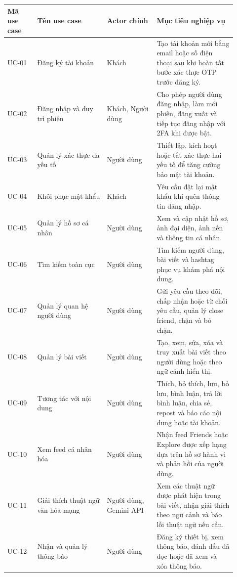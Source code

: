 {\def\LTcaptype{none}
\begin{longtable}{
  |>{\centering\arraybackslash}p{0.12\linewidth}
  |>{\raggedright\arraybackslash}p{0.28\linewidth}
  |>{\raggedright\arraybackslash}p{0.20\linewidth}
  |>{\raggedright\arraybackslash}p{0.32\linewidth}|}
\hline
\textbf{Mã use case} & \textbf{Tên use case} & \textbf{Actor chính} & \textbf{Mục tiêu nghiệp vụ} \\ \hline
\endhead
\hline
\endlastfoot
UC-01 & Đăng ký tài khoản & Khách & Tạo tài khoản mới bằng email hoặc số điện thoại sau khi hoàn tất bước xác thực OTP trước đăng ký. \\ \hline
UC-02 & Đăng nhập và duy trì phiên & Khách, Người dùng & Cho phép người dùng đăng nhập, làm mới phiên, đăng xuất và tiếp tục đăng nhập với 2FA khi được bật. \\ \hline
UC-03 & Quản lý xác thực đa yếu tố & Người dùng & Thiết lập, kích hoạt hoặc tắt xác thực hai yếu tố để tăng cường bảo mật tài khoản. \\ \hline
UC-04 & Khôi phục mật khẩu & Khách & Yêu cầu đặt lại mật khẩu khi quên thông tin đăng nhập. \\ \hline
UC-05 & Quản lý hồ sơ cá nhân & Người dùng & Xem và cập nhật hồ sơ, ảnh đại diện, ảnh nền và thông tin cá nhân. \\ \hline
UC-06 & Tìm kiếm toàn cục & Người dùng & Tìm kiếm người dùng, bài viết và hashtag phục vụ khám phá nội dung. \\ \hline
UC-07 & Quản lý quan hệ người dùng & Người dùng & Gửi yêu cầu theo dõi, chấp nhận hoặc từ chối yêu cầu, quản lý close friend, chặn và bỏ chặn. \\ \hline
UC-08 & Quản lý bài viết & Người dùng & Tạo, xem, sửa, xóa và truy xuất bài viết theo người dùng hoặc theo ngữ cảnh hiển thị. \\ \hline
UC-09 & Tương tác với nội dung & Người dùng & Thích, bỏ thích, lưu, bỏ lưu, bình luận, trả lời bình luận, chia sẻ, repost và báo cáo nội dung hoặc tài khoản. \\ \hline
UC-10 & Xem feed cá nhân hóa & Người dùng & Nhận feed Friends hoặc Explore được xếp hạng dựa trên hồ sơ hành vi và phản hồi của người dùng. \\ \hline
UC-11 & Giải thích thuật ngữ văn hóa mạng & Người dùng, Gemini API & Xem các thuật ngữ được phát hiện trong bài viết, nhận giải thích theo ngữ cảnh và báo lỗi thuật ngữ nếu cần. \\ \hline
UC-12 & Nhận và quản lý thông báo & Người dùng & Đăng ký thiết bị, xem thông báo, đánh dấu đã đọc hoặc đã xem và xóa thông báo. \\ \hline

\end{longtable}}
